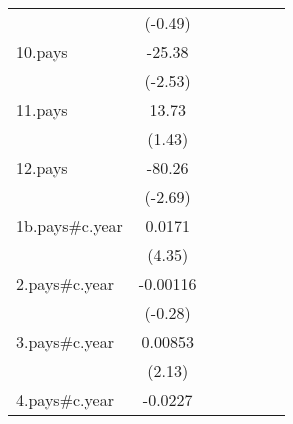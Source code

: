 {\begin{tabular}{l*{6}{c}}
                    &     (-0.49)         &                     &                     &                     &                     &                     \\
[1em]
10.pays             &      -25.38\sym{*}  &                     &                     &                     &                     &                     \\
                    &     (-2.53)         &                     &                     &                     &                     &                     \\
[1em]
11.pays             &       13.73         &                     &                     &                     &                     &                     \\
                    &      (1.43)         &                     &                     &                     &                     &                     \\
[1em]
12.pays             &      -80.26\sym{**} &                     &                     &                     &                     &                     \\
                    &     (-2.69)         &                     &                     &                     &                     &                     \\
[1em]
1b.pays#c.year      &      0.0171\sym{***}&                     &                     &                     &                     &                     \\
                    &      (4.35)         &                     &                     &                     &                     &                     \\
[1em]
2.pays#c.year       &    -0.00116         &                     &                     &                     &                     &                     \\
                    &     (-0.28)         &                     &                     &                     &                     &                     \\
[1em]
3.pays#c.year       &     0.00853\sym{*}  &                     &                     &                     &                     &                     \\
                    &      (2.13)         &                     &                     &                     &                     &                     \\
[1em]
4.pays#c.year       &     -0.0227\sym{***}&                     &                     &                     &                     &                     \\

\end{tabular}}
